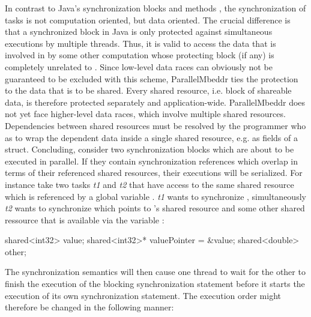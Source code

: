 In contrast to Java's synchronization blocks and methods \cite[p.~279]{JavaPerformanceTuning}, the synchronization of tasks is not computation oriented, but data oriented. The crucial difference is that a synchronized block  in Java is only protected against simultaneous executions by multiple threads. Thus, it is valid to access the data that is involved in  by some other computation whose protecting block (if any) is completely unrelated to . Since low-level data races can obviously not be guaranteed to be excluded with this scheme, ParallelMbeddr ties the protection to the data that is to be shared. Every shared resource, i.e. block of shareable data, is therefore protected separately and application-wide. ParallelMbeddr does not yet face higher-level data races, which involve multiple shared resources. Dependencies between shared resources must be resolved by the programmer who as to wrap the dependent data inside a single shared resource, e.g. as fields of a struct. Concluding, consider two synchronization blocks which are about to be executed in parallel. If they contain synchronization references which overlap in terms of their referenced shared resources, their executions will be serialized. For instance take two tasks \textit{t1} and \textit{t2} that have access to the same shared resource which is referenced by a global variable . \textit{t1} wants to synchronize , simultaneously \textit{t2} wants to synchronize  which points to 's shared resource and some other shared ressource that is available via the variable :

\begin{ccode}
shared<int32> value;
shared<int32>* valuePointer = &value;
shared<double> other;
\end{ccode}
The synchronization semantics will then cause one thread to wait for the other to finish the execution of the blocking synchronization statement before it starts the execution of its own synchronization statement. The execution order might therefore be changed in the following manner:

